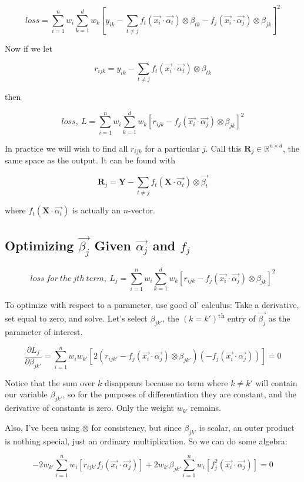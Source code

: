 \documentclass[12pt]{article}
\begin{document}
$$loss = \sum_{i=1}^n w_i \sum_{k=1}^d w_k [y_{ik} - \sum_{t \neq j} f_t(\vec{x_i} \cdot \vec{\alpha_t}) \otimes \beta_{tk} - f_j(\vec{x_i} \cdot \vec{\alpha_j}) \otimes \beta_{jk}]^2$$

Now if we let

$$r_{ijk} = y_{ik} - \sum_{t \neq j} f_t(\vec{x_i} \cdot \vec{\alpha_t}) \otimes \beta_{tk}$$

then

$$loss,\ L = \sum_{i=1}^n w_i \sum_{k=1}^d w_k [r_{ijk} - f_j(\vec{x_i} \cdot \vec{\alpha_j}) \otimes \beta_{jk}]^2$$

In practice we will wish to find all $r_{ijk}$ for a particular $j$. Call this $\pmb{R}_j \in \mathbb{R}^{n \times d}$, the same space as the output. It can be found with

$$\pmb{R}_j = \pmb{Y} - \sum_{t \neq j} f_t(\pmb{X} \cdot \vec{\alpha_t}) \otimes \vec{\beta_t}$$

where $f_t(\pmb{X} \cdot \vec{\alpha_t})$ is actually an $n$-vector.

\subsection{Optimizing $\vec{\beta_j}$ Given $\vec{\alpha_j}$ and $f_j$}

$$loss\ for\ the\ jth\ term,\ L_j = \sum_{i=1}^n w_i \sum_{k=1}^d w_k [r_{ijk} - f_j(\vec{x_i} \cdot \vec{\alpha_j}) \otimes \beta_{jk}]^2$$

To optimize with respect to a parameter, use good ol' calculus: Take a derivative, set equal to zero, and solve. Let's select $\beta_{jk'}$, the $(k=k')$\textsuperscript{th} entry of $\vec{\beta_j}$ as the parameter of interest.

$$\frac{\partial L_j}{\partial \beta_{jk'}} = \sum_{i=1}^n w_i w_{k'} [2(r_{ijk'} - f_j(\vec{x_i} \cdot \vec{\alpha_j}) \otimes \beta_{jk'})(-f_j(\vec{x_i} \cdot \vec{\alpha_j}))] = 0$$

Notice that the sum over $k$ disappears because no term where $k \neq k'$ will contain our variable $\beta_{jk'}$, so for the purposes of differentiation they are constant, and the derivative of constants is zero. Only the weight $w_{k'}$ remains.

Also, I've been using $\otimes$ for consistency, but since $\beta_{jk'}$ is scalar, an outer product is nothing special, just an ordinary multiplication. So we can do some algebra:

$$ -2 w_{k'} \sum_{i=1}^n w_i [r_{ijk'} f_j(\vec{x_i} \cdot \vec{\alpha_j})] + 2 w_{k'} \beta_{jk'} \sum_{i=1}^n w_i [f_j^2(\vec{x_i} \cdot \vec{\alpha_j})] = 0 $$
\end{document}
